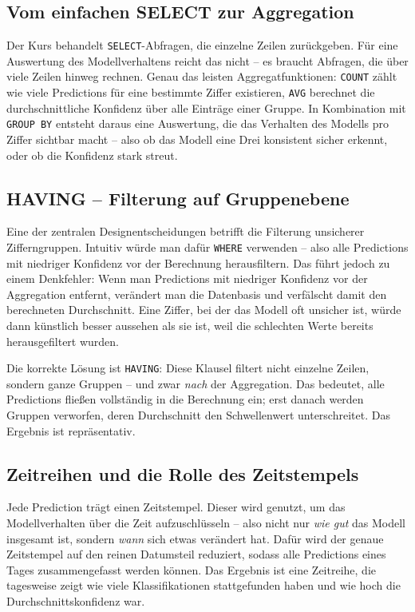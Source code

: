 \documentclass[12pt, a4paper]{article}
\begin{document}
\subsection{Vom einfachen SELECT zur Aggregation}

Der Kurs behandelt \texttt{SELECT}-Abfragen, die einzelne Zeilen
zurückgeben. Für eine Auswertung des Modellverhaltens reicht das nicht --
es braucht Abfragen, die über viele Zeilen hinweg rechnen. Genau das leisten
Aggregatfunktionen: \texttt{COUNT} zählt wie viele Predictions für eine
bestimmte Ziffer existieren, \texttt{AVG} berechnet die durchschnittliche
Konfidenz über alle Einträge einer Gruppe. In Kombination mit
\texttt{GROUP BY} entsteht daraus eine Auswertung, die das Verhalten des
Modells pro Ziffer sichtbar macht -- also ob das Modell eine Drei konsistent
sicher erkennt, oder ob die Konfidenz stark streut.

\subsection{HAVING -- Filterung auf Gruppenebene}

Eine der zentralen Designentscheidungen betrifft die Filterung unsicherer
Zifferngruppen. Intuitiv würde man dafür \texttt{WHERE} verwenden -- also
alle Predictions mit niedriger Konfidenz vor der Berechnung herausfiltern.
Das führt jedoch zu einem Denkfehler: Wenn man Predictions mit niedriger
Konfidenz vor der Aggregation entfernt, verändert man die Datenbasis und
verfälscht damit den berechneten Durchschnitt. Eine Ziffer, bei der das
Modell oft unsicher ist, würde dann künstlich besser aussehen als sie ist,
weil die schlechten Werte bereits herausgefiltert wurden.

Die korrekte Lösung ist \texttt{HAVING}: Diese Klausel filtert nicht
einzelne Zeilen, sondern ganze Gruppen -- und zwar \emph{nach} der
Aggregation. Das bedeutet, alle Predictions fließen vollständig in die
Berechnung ein; erst danach werden Gruppen verworfen, deren Durchschnitt
den Schwellenwert unterschreitet. Das Ergebnis ist repräsentativ.

\subsection{Zeitreihen und die Rolle des Zeitstempels}

Jede Prediction trägt einen Zeitstempel. Dieser wird genutzt, um das
Modellverhalten über die Zeit aufzuschlüsseln -- also nicht nur
\textit{wie gut} das Modell insgesamt ist, sondern \textit{wann} sich
etwas verändert hat. Dafür wird der genaue Zeitstempel auf den reinen
Datumsteil reduziert, sodass alle Predictions eines Tages zusammengefasst
werden können. Das Ergebnis ist eine Zeitreihe, die tagesweise zeigt wie
viele Klassifikationen stattgefunden haben und wie hoch die
Durchschnittskonfidenz war.
\end{document}
